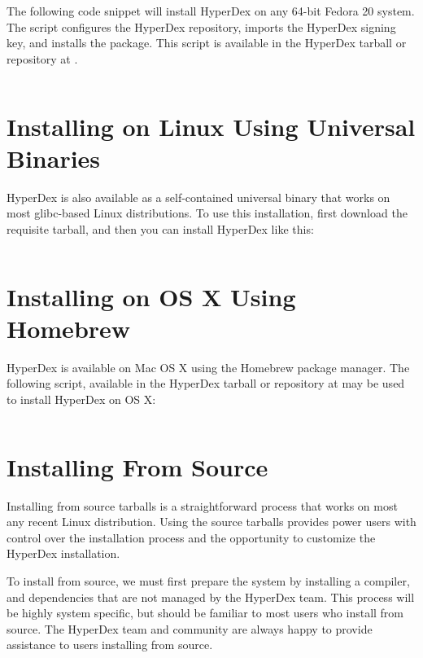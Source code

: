 The following code snippet will install HyperDex on any 64-bit Fedora 20 system.
The script configures the HyperDex repository, imports the HyperDex signing key,
and installs the  package.  This script is available in the
HyperDex tarball or repository at .

\inputminted[frame=lines,framesep=2mm,firstline=5]{bash}{\topdir/install/fedora-packages.sh}

\section{Installing on Linux Using Universal Binaries}
\label{sec:installation:universal-linux}

HyperDex is also available as a self-contained universal binary that works on
most glibc-based Linux distributions.  To use this installation, first download
the requisite tarball, and then you can install HyperDex like this:

\inputminted[frame=lines,framesep=2mm,firstline=3]{bash}{\topdir/install/linux-amd64.sh}

\section{Installing on OS X Using Homebrew}
\label{sec:installation:os-x-homebrew}

HyperDex is available on Mac OS X using the Homebrew package manager.  The
following script, available in the HyperDex tarball or repository at
 may be used to install HyperDex on OS X:

\inputminted[frame=lines,framesep=2mm,firstline=3]{bash}{\topdir/install/homebrew.sh}

\section{Installing From Source}

Installing from source tarballs is a straightforward process that works on most
any recent Linux distribution.  Using the source tarballs provides power users
with control over the installation process and the opportunity to customize
the HyperDex installation.

To install from source, we must first prepare the system by installing a
compiler, and dependencies that are not managed by the HyperDex team.  This
process will be highly system specific, but should be familiar to most users who
install from source.  The HyperDex team and community are always happy to
provide assistance to users installing from source.

